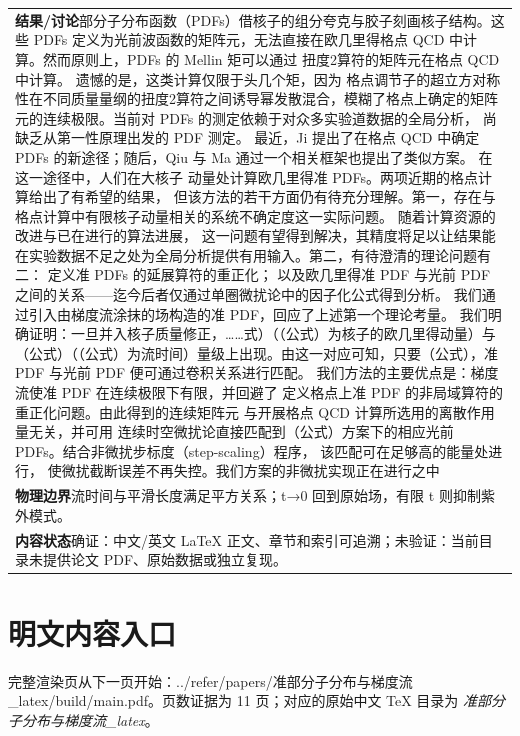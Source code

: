 \documentclass[UTF8,11pt,oneside]{ctexbook}
\begin{document}
\begin{table}[htbp]
\begin{tabular}{@{}p{}@{}}
    \textbf{结果/讨论}\quad 部分子分布函数（PDFs）借核子的组分夸克与胶子刻画核子结构。这些 PDFs 定义为光前波函数的矩阵元，无法直接在欧几里得格点 QCD 中计算。然而原则上，PDFs 的 Mellin 矩可以通过 扭度2算符的矩阵元在格点 QCD 中计算。 遗憾的是，这类计算仅限于头几个矩，因为 格点调节子的超立方对称性在不同质量量纲的扭度2算符之间诱导幂发散混合，模糊了格点上确定的矩阵元的连续极限。当前对 PDFs 的测定依赖于对众多实验道数据的全局分析， 尚缺乏从第一性原理出发的 PDF 测定。 最近，Ji 提出了在格点 QCD 中确定 PDFs 的新途径；随后，Qiu 与 Ma 通过一个相关框架也提出了类似方案。 在这一途径中，人们在大核子 动量处计算欧几里得准 PDFs。两项近期的格点计算给出了有希望的结果， 但该方法的若干方面仍有待充分理解。第一，存在与格点计算中有限核子动量相关的系统不确定度这一实际问题。 随着计算资源的改进与已在进行的算法进展， 这一问题有望得到解决，其精度将足以让结果能在实验数据不足之处为全局分析提供有用输入。第二，有待澄清的理论问题有二： 定义准 PDFs 的延展算符的重正化； 以及欧几里得准 PDF 与光前 PDF 之间的关系——迄今后者仅通过单圈微扰论中的因子化公式得到分析。 我们通过引入由梯度流涂抹的场构造的准 PDF，回应了上述第一个理论考量。 我们明确证明：一旦并入核子质量修正，……式）（（公式）为核子的欧几里得动量）与（公式）（（公式）为流时间）量级上出现。由这一对应可知，只要（公式），准 PDF 与光前 PDF 便可通过卷积关系进行匹配。 我们方法的主要优点是：梯度流使准 PDF 在连续极限下有限，并回避了 定义格点上准 PDF 的非局域算符的重正化问题。由此得到的连续矩阵元 与开展格点 QCD 计算所选用的离散作用量无关，并可用 连续时空微扰论直接匹配到（公式）方案下的相应光前 PDFs。结合非微扰步标度（step-scaling）程序， 该匹配可在足够高的能量处进行， 使微扰截断误差不再失控。我们方案的非微扰实现正在进行之中 \\
    \textbf{物理边界}\quad 流时间与平滑长度满足平方关系；t→0 回到原始场，有限 t 则抑制紫外模式。 \\
    \textbf{内容状态}\quad 确证：中文/英文 LaTeX 正文、章节和索引可追溯；未验证：当前目录未提供论文 PDF、原始数据或独立复现。 \\
    \bottomrule
  \end{tabular}
\end{table}
\section*{明文内容入口}
\noindent 完整渲染页从下一页开始：../\allowbreak{}refer/\allowbreak{}papers/\allowbreak{}准部分子分布与梯度流\_\allowbreak{}latex/\allowbreak{}build/\allowbreak{}main.pdf。页数证据为 11 页；对应的原始中文 TeX 目录为 \emph{准部分子分布与梯度流\_latex}。
\clearpage

\clearpage
\end{document}
